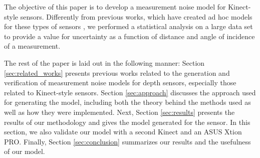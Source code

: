 
The objective of this paper is to develop a measurement noise model for
Kinect-style sensors. Differently from previous works, which have created ad hoc models for
these types of sensors \cite{Newcombe2011}\cite{Fallon2012}, we
performed a statistical analysis on a large data set to provide a value for
uncertainty as a function of distance and angle of incidence of a measurement.

The rest of the paper is laid out in the following manner: Section
\ref{sec:related_works} presents previous works related to the generation and
verification of measurement noise models for depth sensors, especially those
related to Kinect-style sensors. Section \ref{sec:approach} discusses the
approach used for generating the model, including both the theory behind the
methods used as well as how they were implemented. Next, Section
\ref{sec:results} presents the results of our methodology and gives the model
generated for the sensor. In this section, we also validate our model with a
second Kinect and an ASUS Xtion PRO. Finally, Section
\ref{sec:conclusion} summarizes our results and the usefulness of our model.  


